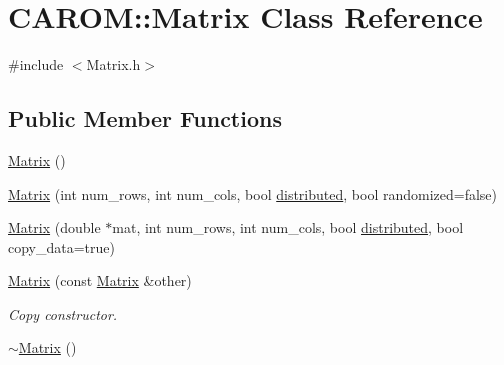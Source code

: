 \hypertarget{class_c_a_r_o_m_1_1_matrix}{\section{C\-A\-R\-O\-M\-:\-:Matrix Class Reference}
\label{class_c_a_r_o_m_1_1_matrix}
}


{\ttfamily \#include $<$Matrix.\-h$>$}

\subsection*{Public Member Functions}
\begin{DoxyCompactItemize}
\item 
\hyperlink{class_c_a_r_o_m_1_1_matrix_ad68ec85e555f2ad2f684da50cabd5df6}{Matrix} ()
\item 
\hyperlink{class_c_a_r_o_m_1_1_matrix_aa5c81dbee59703eb959e7e1b6dae2e8b}{Matrix} (int num\-\_\-rows, int num\-\_\-cols, bool \hyperlink{class_c_a_r_o_m_1_1_matrix_a861d3e43b223e8f3217f64a536281605}{distributed}, bool randomized=false)
\item 
\hyperlink{class_c_a_r_o_m_1_1_matrix_afe257256e4912f550567bd1524076807}{Matrix} (double $\ast$mat, int num\-\_\-rows, int num\-\_\-cols, bool \hyperlink{class_c_a_r_o_m_1_1_matrix_a861d3e43b223e8f3217f64a536281605}{distributed}, bool copy\-\_\-data=true)
\item 
\hyperlink{class_c_a_r_o_m_1_1_matrix_abf54e74356673b4139c704eaf9091e4d}{Matrix} (const \hyperlink{class_c_a_r_o_m_1_1_matrix}{Matrix} \&other)
\begin{DoxyCompactList}\small\item\em Copy constructor. \end{DoxyCompactList}\item 
\hypertarget{class_c_a_r_o_m_1_1_matrix_abb5b039c240bdc22ab142ff63fa7f4ba}{\hyperlink{class_c_a_r_o_m_1_1_matrix_abb5b039c240bdc22ab142ff63fa7f4ba}{$\sim$\-Matrix} ()}\label{class_c_a_r_o_m_1_1_matrix_abb5b039c240bdc22ab142ff63fa7f4ba}


\end{DoxyCompactItemize}
